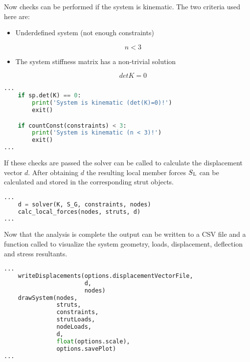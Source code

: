 Now checks can be performed if the system is kinematic. The two criteria used here are:
\begin{itemize}

  \item Underdefined system (not enough constraints)

\begin{equation}
n < 3
\end{equation}

  \item The system stiffness matrix has a non-trivial solution

\begin{equation}
det K = 0
\end{equation}

\end{itemize}

\begin{inconsolata}
\begin{minipage}{\linewidth}
\begin{lstlisting}[language=python]
...
    if sp.det(K) == 0:
        print('System is kinematic (det(K)=0)!')
        exit()

    if countConst(constraints) < 3:
        print('System is kinematic (n < 3)!')
        exit()
...
\end{lstlisting}
\end{minipage}
\end{inconsolata}

If these checks are passed the solver can be called to calculate the displacement vector $d$.
After obtaining $d$ the resulting local member forces $S\textsubscript{L}$ can be calculated and stored in the corresponding strut objects.

\begin{inconsolata}
\begin{minipage}{\linewidth}
\begin{lstlisting}[language=python]
...
    d = solver(K, S_G, constraints, nodes)
    calc_local_forces(nodes, struts, d)
...
\end{lstlisting}
\end{minipage}
\end{inconsolata}

Now that the analysis is complete the output can be written to a CSV file and a function called to visualize the system geometry, loads, displacement, deflection and stress resultants.

\begin{inconsolata}
\begin{minipage}{\linewidth}
\begin{lstlisting}[language=python]
...
    writeDisplacements(options.displacementVectorFile,
                       d,
                       nodes)
    drawSystem(nodes,
               struts,
               constraints,
               strutLoads,
               nodeLoads,
               d,
               float(options.scale),
               options.savePlot)
...
\end{lstlisting}
\end{minipage}
\end{inconsolata}


